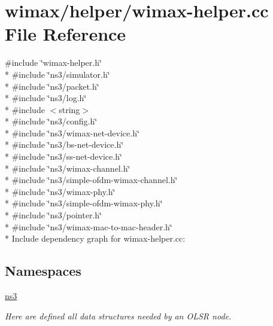 \hypertarget{wimax-helper_8cc}{}\section{wimax/helper/wimax-\/helper.cc File Reference}
\label{wimax-helper_8cc}
{\ttfamily \#include \char`\"{}wimax-\/helper.\+h\char`\"{}}\\*
{\ttfamily \#include \char`\"{}ns3/simulator.\+h\char`\"{}}\\*
{\ttfamily \#include \char`\"{}ns3/packet.\+h\char`\"{}}\\*
{\ttfamily \#include \char`\"{}ns3/log.\+h\char`\"{}}\\*
{\ttfamily \#include $<$string$>$}\\*
{\ttfamily \#include \char`\"{}ns3/config.\+h\char`\"{}}\\*
{\ttfamily \#include \char`\"{}ns3/wimax-\/net-\/device.\+h\char`\"{}}\\*
{\ttfamily \#include \char`\"{}ns3/bs-\/net-\/device.\+h\char`\"{}}\\*
{\ttfamily \#include \char`\"{}ns3/ss-\/net-\/device.\+h\char`\"{}}\\*
{\ttfamily \#include \char`\"{}ns3/wimax-\/channel.\+h\char`\"{}}\\*
{\ttfamily \#include \char`\"{}ns3/simple-\/ofdm-\/wimax-\/channel.\+h\char`\"{}}\\*
{\ttfamily \#include \char`\"{}ns3/wimax-\/phy.\+h\char`\"{}}\\*
{\ttfamily \#include \char`\"{}ns3/simple-\/ofdm-\/wimax-\/phy.\+h\char`\"{}}\\*
{\ttfamily \#include \char`\"{}ns3/pointer.\+h\char`\"{}}\\*
{\ttfamily \#include \char`\"{}ns3/wimax-\/mac-\/to-\/mac-\/header.\+h\char`\"{}}\\*
Include dependency graph for wimax-\/helper.cc\+:
\subsection*{Namespaces}
\begin{DoxyCompactItemize}
\item 
 \hyperlink{namespacens3}{ns3}
\begin{DoxyCompactList}\small\item\em Here are defined all data structures needed by an O\+L\+SR node. \end{DoxyCompactList}\end{DoxyCompactItemize}
